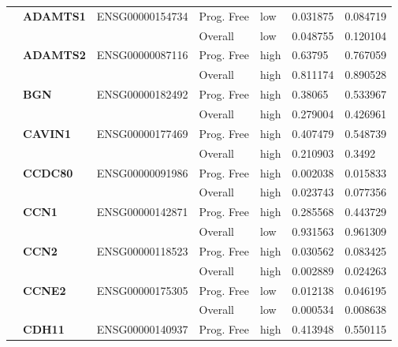 \begin{spacing}{1}
{\begin{longtable}{%
            |>{\bfseries}p{2cm}|
            >{\bfseries}p{1.9cm}|
            >{\tiny}p{1.9cm}|
            p{2cm}|
            p{2cm}|
            p{1.5cm}|
            p{1.5cm}|
            }
            \multirow{2}{3cm}{False}
             & ADAMTS1  & ENSG00000154734 & Prog. Free & low  & 0.031875 & 0.084719 \\
            \hhline{~~~----}
             &          &                 & Overall    & low  & 0.048755 & 0.120104 \\
            \hhline{~======}
             & ADAMTS2  & ENSG00000087116 & Prog. Free & high & 0.63795  & 0.767059 \\
            \hhline{~~~----}
             &          &                 & Overall    & high & 0.811174 & 0.890528 \\
            \hhline{~======}
             & BGN      & ENSG00000182492 & Prog. Free & high & 0.38065  & 0.533967 \\
            \hhline{~~~----}
             &          &                 & Overall    & high & 0.279004 & 0.426961 \\
            \hhline{~======}
             & CAVIN1   & ENSG00000177469 & Prog. Free & high & 0.407479 & 0.548739 \\
            \hhline{~~~----}
             &          &                 & Overall    & high & 0.210903 & 0.3492   \\
            \hhline{~======}
             & CCDC80   & ENSG00000091986 & Prog. Free & high & 0.002038 & 0.015833 \\
            \hhline{~~~----}
             &          &                 & Overall    & high & 0.023743 & 0.077356 \\
            \hhline{~======}
             & CCN1     & ENSG00000142871 & Prog. Free & high & 0.285568 & 0.443729 \\
            \hhline{~~~----}
             &          &                 & Overall    & low  & 0.931563 & 0.961309 \\
            \hhline{~======}
             & CCN2     & ENSG00000118523 & Prog. Free & high & 0.030562 & 0.083425 \\
            \hhline{~~~----}
             &          &                 & Overall    & high & 0.002889 & 0.024263 \\
            \hhline{~======}
             & CCNE2    & ENSG00000175305 & Prog. Free & low  & 0.012138 & 0.046195 \\
            \hhline{~~~----}
             &          &                 & Overall    & low  & 0.000534 & 0.008638 \\
            \hhline{~======}
             & CDH11    & ENSG00000140937 & Prog. Free & high & 0.413948 & 0.550115 \\

\end{longtable}}
\end{spacing}
